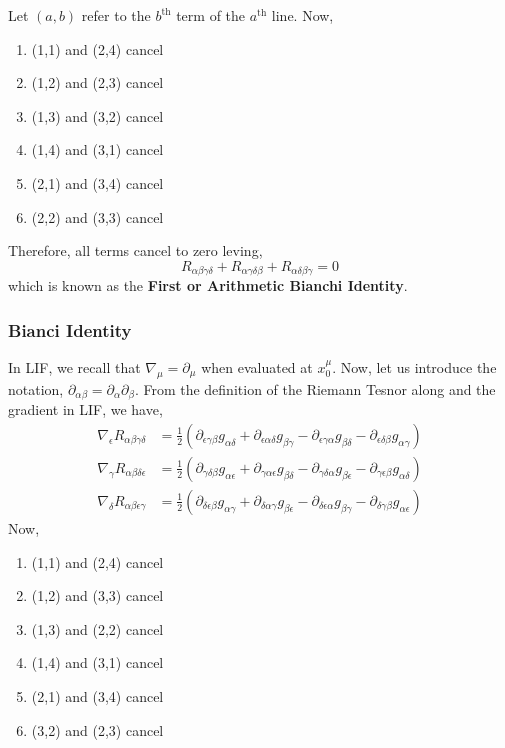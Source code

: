 \documentclass[11pt, a4paper]{article}
\begin{document}
Let $(a, b)$ refer to the $b^{\text{th}}$ term of the $a^{\text{th}}$ line. Now,
\begin{enumerate}
\item (1,1) and (2,4) cancel
\item (1,2) and (2,3) cancel
\item (1,3) and (3,2) cancel
\item (1,4) and (3,1) cancel
\item (2,1) and (3,4) cancel
\item (2,2) and (3,3) cancel
\end{enumerate}
Therefore, all terms cancel to zero leving,
\[ R_{\alpha \beta \gamma \delta} + R_{\alpha \gamma \delta \beta} + R_{\alpha \delta \beta \gamma} = 0 \]
which is known as the \textbf{First or Arithmetic Bianchi Identity}.
\subsubsection{Bianci Identity}
In LIF, we recall that $\nabla_\mu = \partial_\mu$ when evaluated at $x^\mu _0$.  Now, let us introduce the notation, $\partial_{\alpha\beta} = \partial_\alpha\partial_\beta$.  From the definition of the Riemann Tesnor along and the gradient in LIF, we have, 
\begin{align*}
\nabla_\epsilon R_{\alpha\beta\gamma\delta} &= \tfrac{1}{2}\left(\partial_{\epsilon\gamma\beta} g_{\alpha\delta} + \partial_{\epsilon\alpha\delta} g_{\beta\gamma} - \partial_{\epsilon\gamma\alpha}g_{\beta\delta} - \partial_{\epsilon\delta\beta}g_{\alpha\gamma}\right)
    \\
\nabla_\gamma R_{\alpha\beta\delta\epsilon} &= \tfrac{1}{2}\left(\partial_{\gamma\delta\beta} g_{\alpha\epsilon} + \partial_{\gamma\alpha\epsilon} g_{\beta\delta} - \partial_{\gamma\delta\alpha}g_{\beta\epsilon} - \partial_{\gamma\epsilon\beta}g_{\alpha\delta}\right)
    \\
\nabla_\delta R_{\alpha\beta\epsilon\gamma} &= \tfrac{1}{2}\left(\partial_{\delta\epsilon\beta} g_{\alpha\gamma} + \partial_{\delta\alpha\gamma} g_{\beta\epsilon} - \partial_{\delta\epsilon\alpha}g_{\beta\gamma} - \partial_{\delta\gamma\beta} g_{\alpha\epsilon}\right)
\end{align*}
Now,
\begin{enumerate}
\item (1,1) and (2,4) cancel
\item (1,2) and (3,3) cancel
\item (1,3) and (2,2) cancel
\item (1,4) and (3,1) cancel
\item (2,1) and (3,4) cancel
\item (3,2) and (2,3) cancel
\end{enumerate}
\end{document}
